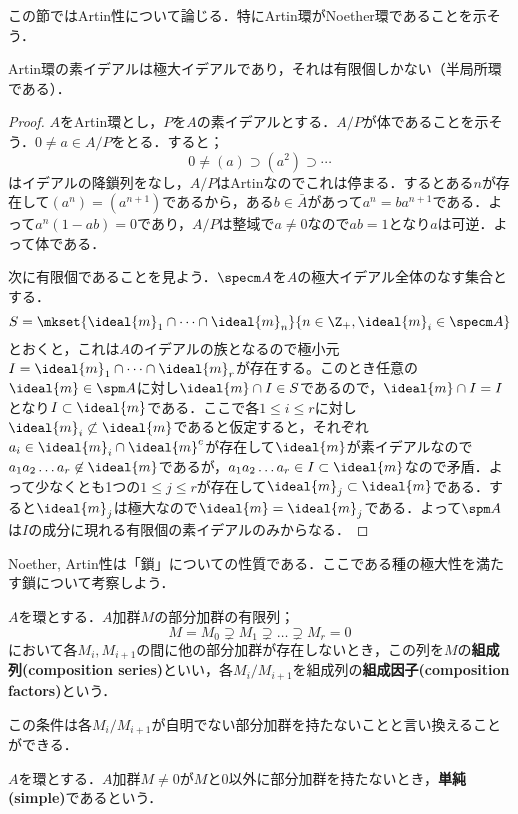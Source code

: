 この節ではArtin性について論じる．特にArtin環がNoether環であることを示そう．
\begin{prop}\label{prop:Artinの素イデアル}
	Artin環の素イデアルは極大イデアルであり，それは有限個しかない（半局所環である）．
\end{prop}
\begin{proof}
	$A$をArtin環とし，$P$を$A$の素イデアルとする．$A/P$が体であることを示そう．$0\neq a\in A/P$をとる．すると；
	\[0\neq(a)\supset(a^2)\supset\cdots\]
	はイデアルの降鎖列をなし，$A/P$はArtinなのでこれは停まる．するとある$n$が存在して$(a^n)=(a^{n+1})$であるから，ある$b\in\bar{A}$があって$a^n=ba^{n+1}$である．よって$a^n(1-ab)=0$であり，$A/P$は整域で$a\neq0$なので$ab=1$となり$a$は可逆．よって体である．
	
	次に有限個であることを見よう．$\specm A$を$A$の極大イデアル全体のなす集合とする．
	\[S=\mkset{\ideal{m}_1\cap\dots\cap\ideal{m}_n}{n\in\Z_+,\ideal{m}_i\in\specm A}\]
	とおくと，これは$A$のイデアルの族となるので極小元$I=\ideal{m}_1\cap\dots\cap\ideal{m}_r$が存在する。このとき任意の$\ideal{m}\in\spm A$に対し$\ideal{m}\cap I\in S$であるので，$\ideal{m}\cap I=I$となり$I\subset\ideal{m}$である．ここで各$1\leq i\leq r$に対し$\ideal{m}_i\not\subset\ideal{m}$であると仮定すると，それぞれ$a_i\in\ideal{m}_i\cap\ideal{m}^c$が存在して$\ideal{m}$が素イデアルなので$a_1a_2\dots a_r\not\in\ideal{m}$であるが，$a_1a_2\dots a_r\in I\subset\ideal{m}$なので矛盾．よって少なくとも1つの$1\leq j\leq r$が存在して$\ideal{m}_j\subset\ideal{m}$である．すると$\ideal{m}_j$は極大なので$\ideal{m}=\ideal{m}_j$である．よって$\spm A$は$I$の成分に現れる有限個の素イデアルのみからなる．
\end{proof}

Noether, Artin性は「鎖」についての性質である．ここである種の極大性を満たす鎖について考察しよう．

\begin{defi}[組成列]\label{defi:組成列}
	$A$を環とする．$A$加群$M$の部分加群の有限列；
	\[M=M_0\supsetneq M_1\supsetneq\dots\supsetneq M_r=0\]
	において各$M_i,M_{i+1}$の間に他の部分加群が存在しないとき，この列を$M$の\textbf{組成列(composition series)}といい，各$M_i/M_{i+1}$を組成列の\textbf{組成因子(composition factors)}という．
\end{defi}

この条件は各$M_i/M_{i+1}$が自明でない部分加群を持たないことと言い換えることができる．

\begin{defi}[単純加群]
	$A$を環とする．$A$加群$M\neq0$が$M$と0以外に部分加群を持たないとき，\textbf{単純(simple)}であるという．
\end{defi}

